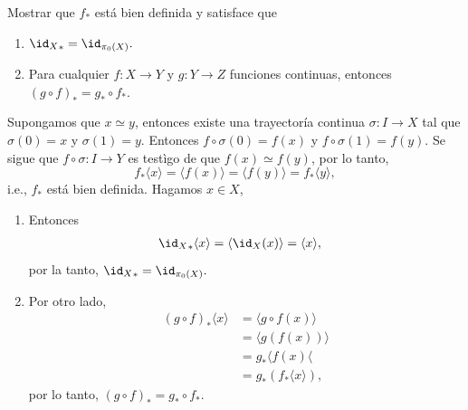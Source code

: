 \begin{ejercicio}
    Mostrar que $f_*$ está bien definida y satisface que
    \begin{enumerate}[label=(\arabic*)]
        \item  ${\id_X}_*=\id_{\pi_0(X)}.$
        \item  Para cualquier $f:X\to Y$ y $g:Y\to Z$ funciones continuas, entonces $(g\circ f)_*=g_*\circ f_*$.
    \end{enumerate}
\end{ejercicio}

\begin{demostracion}
Supongamos que $x\simeq y$, entonces existe una trayectoría continua $\sigma:I\to X$ tal que $\sigma(0)=x$ y $\sigma(1)=y$. Entonces $f\circ \sigma(0)=f(x)$ y $f\circ \sigma(1)=f(y)$. Se sigue que $f\circ \sigma: I\to Y$ es testìgo de que $f(x)\simeq f(y)$, por lo tanto, 
$$f_*\langle x\rangle=\langle f(x)\rangle=\langle f(y)\rangle=f_*\langle y\rangle,$$
i.e., $f_*$ está bien definida. Hagamos $x\in X$,
\begin{enumerate}[label=(\arabic*)]
    \item Entonces 
    \begin{align*}
        {\id_X}_*\langle x\rangle &=\langle\id_X(x)\rangle=\langle x\rangle,
    \end{align*}
    por la tanto, ${\id_X}_*=\id_{\pi_0(X)}.$
    \item Por otro lado,
    \begin{align*}
        (g\circ f)_*\langle x\rangle
        &=\langle g\circ f(x)\rangle\\
        &=\langle g(f(x))\rangle\\
        &=g_*\langle f(x)\langle\\
        &=g_*(f_*\langle x\rangle),
    \end{align*}
    por lo tanto, $(g\circ f)_*=g_*\circ f_*$.
\end{enumerate}
\end{demostracion}
